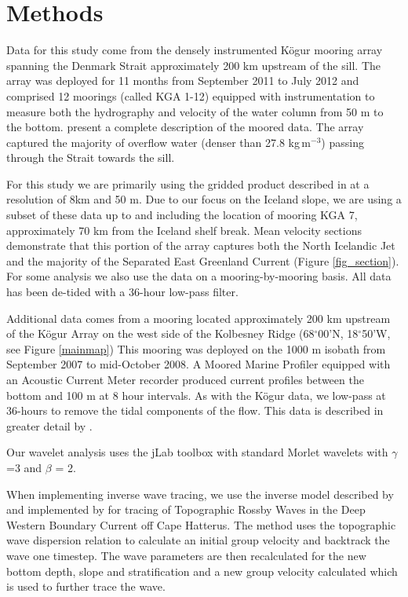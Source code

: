 \documentclass[12pt,titlepage,figuresatend]{article}
\begin{document}
\section{Methods}

Data for this study come from the densely instrumented K\"{o}gur mooring array spanning the Denmark Strait approximately 200 km upstream of the sill. The array was deployed for 11 months from September 2011 to July 2012 and comprised 12 moorings (called KGA 1-12) equipped with instrumentation to measure both the hydrography and velocity of the water column from 50 m to the bottom. \cite{Harden2016} present a complete description of the moored data. The array captured the majority of overflow water (denser than 27.8 kg$\,$m$^{-3}$) passing through the Strait towards the sill.

For this study we are primarily using the gridded product described in \cite{Harden2016} at a resolution of 8km and 50 m. Due to our focus on the Iceland slope, we are using a subset of these data up to and including the location of mooring KGA 7, approximately 70 km from the Iceland shelf break. Mean velocity sections demonstrate that this portion of the array captures both the North Icelandic Jet and the majority of the Separated East Greenland Current (Figure \ref{fig_section}). For some analysis we also use the data on a mooring-by-mooring basis. All data has been de-tided with a 36-hour low-pass filter.

Additional data comes from a mooring located approximately 200 km upstream of the K\"{o}gur Array on the west side of the Kolbesney Ridge (68$^{\circ}$00'N, 18$^{\circ}$50'W, see Figure \ref{mainmap}) This mooring was deployed on the 1000 m isobath from September 2007 to mid-October 2008. A Moored Marine Profiler equipped with an Acoustic Current Meter recorder produced current profiles between the bottom and 100 m at 8 hour intervals. As with the K\"{o}gur data, we low-pass at 36-hours to remove the tidal components of the flow. This data is described in greater detail by \cite{Jonsson2012}.

Our wavelet analysis uses the jLab toolbox \cite[]{Lilly2017} with standard Morlet wavelets with $\gamma$=3 and $\beta$ = 2.

When implementing inverse wave tracing, we use the inverse model described by \cite{Meinen1993} and implemented by \cite{Pickart1995} for tracing of Topographic Rossby Waves in the Deep Western Boundary Current off Cape Hatterus. The method uses the topographic wave dispersion relation to calculate an initial group velocity and backtrack the wave one timestep. The wave parameters are then recalculated for the new bottom depth, slope and stratification and a new group velocity calculated which is used to further trace the wave.
\end{document}
